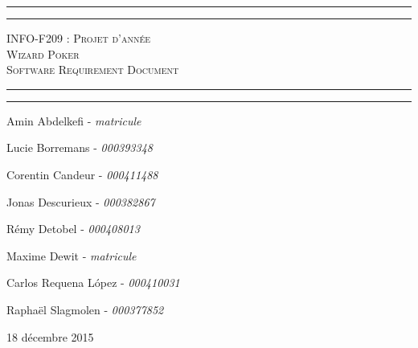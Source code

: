 \begin{titlepage}

\begin{center}
    \vspace*{\fill}
        \hrule
        \vspace*{2pt}
        \hrule
        \vspace*{15pt}
        \textsc{\Huge{INFO-F209 : Projet d'année \\\vspace*{8pt}
            Wizard Poker\\\vspace*{12pt}
            Software Requirement Document}}
        \vspace*{15pt}
        \hrule
        \vspace*{2pt}
        \hrule
  \vspace*{\fill}
\end{center}
\null
\vfill

\hfill Amin Abdelkefi - \emph{matricule}

\hfill Lucie Borremans - \emph{000393348}

\hfill Corentin Candeur - \emph{000411488}

\hfill Jonas Descurieux - \emph{000382867}

\hfill Rémy Detobel - \emph{000408013}

\hfill Maxime Dewit - \emph{matricule}

\hfill Carlos Requena López - \emph{000410031}

\hfill Raphaël Slagmolen - \emph{000377852}

\large 18 décembre 2015

\end{titlepage}
